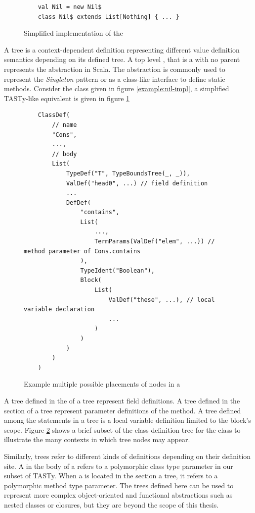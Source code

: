 \begin{figure}[!htb]
	\begin{verbatim}
	val Nil = new Nil$
	class Nil$ extends List[Nothing] { ... }
	\end{verbatim} 
	\caption{Simplified implementation of the }
	\label{example:decomp-object}
\end{figure}

A  tree is a context-dependent definition representing different value definition semantics depending on its defined tree.
A top level , that is a  with no parent represents the  abstraction in Scala.
The  abstraction is commonly used to represent the \textit{Singleton} pattern\cite{go4:design-patterns} or as a class-like interface to define static methods.
Consider the  class given in figure \ref{example:nil-impl}, a simplified TASTy-like equivalent is given in figure \ref{example:decomp-object}

\begin{figure}[!htb]
	\begin{verbatim}
	ClassDef(
		// name 
		"Cons",
		...,
		// body
		List(
			TypeDef("T", TypeBoundsTree(_, _)),
			ValDef("head0", ...) // field definition
			...
			DefDef(
				"contains",
				List(
					...,
					TermParams(ValDef("elem", ...)) // method parameter of Cons.contains
				),
				TypeIdent("Boolean"),
				Block(
					List(
						ValDef("these", ...), // local variable declaration		
						...
					)
				)
			)
		)
	)
	\end{verbatim} 
	\caption{Example multiple possible placements of  nodes in a }
	\label{example:many-valdefs}
\end{figure}

A  tree defined in the  of a  tree represent field definitions.
A  tree defined in the  section of a  tree represent parameter definitions of the method.
A  tree defined among the statements in a  tree is a local variable definition limited to the block's scope.
Figure \ref{example:many-valdefs} shows a brief subset of the class definition tree for the  class to illustrate the many contexts in which  tree nodes may appear.

Similarly,  trees refer to different kinds of definitions depending on their definition site.
A  in the body of a  refers to a polymorphic class type parameter in our subset of TASTy.
When a  is located in the  section a  tree, it refers to a polymorphic method type parameter.
The trees defined here can be used to represent more complex object-oriented and functional abstractions such as nested classes or closures, but they are beyond the scope of this thesis.

